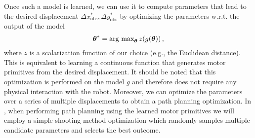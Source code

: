 Once such a model is learned, we can use it to compute parameters that lead to the desired displacement $\Delta x^*_\text{obs}, \Delta y^*_\text{obs}$ by optimizing the parameters w.r.t. the output of the model
\begin{align}
	\parameters^* = \maximize_{\parameters}\, z(g(\parameters))\,,
% 
\end{align}
%
where $z$ is a scalarization function of our choice (e.g., the Euclidean distance).
This is equivalent to learning a continuous function that generates motor primitives from the desired displacement.
It should be noted that this optimization is performed on the model $g$ and therefore does not require any physical interaction with the robot.
Moreover, we can optimize the parameters over a series of multiple displacements to obtain a path planning optimization. 
In , when performing path planning using the learned motor primitives we will employ a simple shooting method optimization which randomly samples multiple candidate parameters and selects the best outcome.

